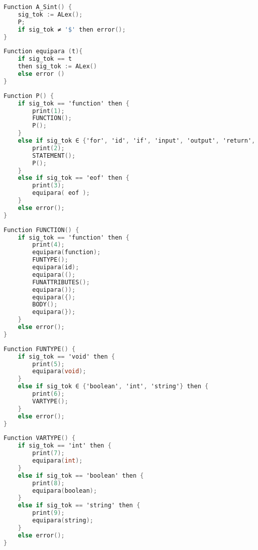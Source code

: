 \renewcommand{\lstlistingname}{Función} %

\begin{lstlisting}[language=C, caption={Main del Analizador Sintáctico}]
Function A_Sint() {
    sig_tok := ALex();
    P;
    if sig_tok ≠ '$' then error();
}
\end{lstlisting}

\begin{lstlisting}[language=C, caption={Equipara}]
Function equipara (t){
    if sig_tok == t
    then sig_tok := ALex()
    else error ()
}
\end{lstlisting}

\begin{lstlisting}[language=C, caption={P}]
Function P() {
    if sig_tok == 'function' then {
        print(1);
        FUNCTION();
        P();
    }
    else if sig_tok ∈ {'for', 'id', 'if', 'input', 'output', 'return', 'var'} then {
        print(2);
        STATEMENT();
        P();
    }
    else if sig_tok == 'eof' then {
        print(3);
        equipara( eof );
    }
    else error();
}
\end{lstlisting}

\begin{lstlisting}[language=C, caption={FUNCTION}]
Function FUNCTION() {
    if sig_tok == 'function' then {
        print(4);
        equipara(function);
        FUNTYPE();
        equipara(id);
        equipara(();
        FUNATTRIBUTES();
        equipara());
        equipara({);
        BODY();
        equipara(});
    }
    else error();
}
\end{lstlisting}

\begin{lstlisting}[language=C, caption={FUNTYPE}]
Function FUNTYPE() {
    if sig_tok == 'void' then {
        print(5);
        equipara(void);
    }
    else if sig_tok ∈ {'boolean', 'int', 'string'} then {
        print(6);
        VARTYPE();
    }
    else error();
}
\end{lstlisting}

\begin{lstlisting}[language=C, caption={VARTYPE}]
Function VARTYPE() {
    if sig_tok == 'int' then {
        print(7);
        equipara(int);
    }
    else if sig_tok == 'boolean' then {
        print(8);
        equipara(boolean);
    }
    else if sig_tok == 'string' then {
        print(9);
        equipara(string);
    }
    else error();
}
\end{lstlisting}

